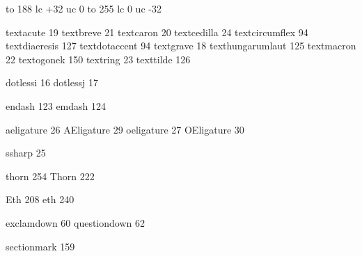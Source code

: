 


\startmapping[qx] %

 to 188 lc +32 uc 0
 to 255 lc 0 uc -32

\stopmapping

\startencoding[qx]

 textacute         19
 textbreve         21
 textcaron         20
 textcedilla       24
 textcircumflex    94
 textdiaeresis    127
 textdotaccent     94
 textgrave         18
 texthungarumlaut 125
 textmacron        22
 textogonek       150
 textring          23
 texttilde        126

 dotlessi          16
 dotlessj          17

 endash           123
 emdash           124

 aeligature        26
 AEligature        29
 oeligature        27
 OEligature        30

 ssharp            25

 thorn            254
 Thorn            222

 Eth              208
 eth              240

 exclamdown        60
 questiondown      62

 sectionmark      159

